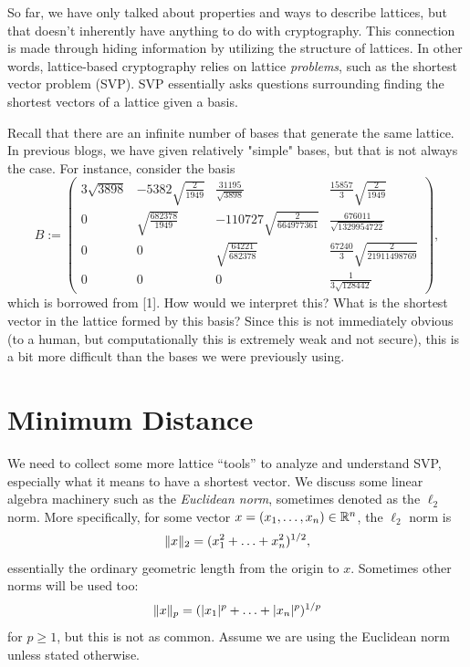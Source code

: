 \documentclass{article}
\begin{document}


So far, we have only talked about properties and ways to describe lattices, but that doesn't inherently have anything to do with cryptography.
This connection is made through hiding information by utilizing the structure of lattices.
In other words, lattice-based cryptography relies on lattice \emph{problems}, such as the shortest vector problem (SVP).
SVP essentially asks questions surrounding finding the shortest vectors of a lattice given a basis.

Recall that there are an infinite number of bases that generate the same lattice.
In previous blogs, we have given relatively "simple" bases, but that is not always the case.
For instance, consider the basis
\[
B :=
\begin{pmatrix}
3\sqrt{3898}
&
-5382\sqrt{\frac{2}{1949}}
&
\frac{31195}{\sqrt{3898}}
&
\frac{15857}{3}\sqrt{\frac{2}{1949}}
\\
0
&
\sqrt{\frac{682378}{1949}}
&
-110727\sqrt{\frac{2}{664977361}}
&
\frac{676011}{\sqrt{1329954722}}
\\
0
&
0
&
\sqrt{\frac{64221}{682378}}
&
\frac{67240}{3}\sqrt{\frac{2}{21911498769}}
\\
0
&
0
&
0
&
\frac{1}{3\sqrt{128442}}
\end{pmatrix},
\]
which is borrowed from [1].
How would we interpret this?
What is the shortest vector in the lattice formed by this basis?
Since this is not immediately obvious (to a human, but computationally this is extremely weak and not secure), this is a bit more difficult than the bases we were previously using.




\section{Minimum Distance}
We need to collect some more lattice ``tools'' to analyze and understand SVP, especially what it means to have a shortest vector.
We discuss some linear algebra machinery such as the \emph{Euclidean norm}, sometimes denoted as the $\ell_2$ norm.
More specifically, for some vector $x = (x_1, \ldots, x_n) \in \mathbb{R}^n$, the $\ell_2$ norm is
\[
\lVert x \rVert_2 = (x_1^2 + \ldots + x_n^2)^{1/2},
\]
essentially the ordinary geometric length from the origin to $x$.
Sometimes other norms will be used too:
\[
\lVert x \rVert_p = (\lvert x_1\rvert^p + \ldots + \lvert x_n \rvert^p)^{1/p}
\]
for $p \geq 1$, but this is not as common.
Assume we are using the Euclidean norm unless stated otherwise.
\end{document}
